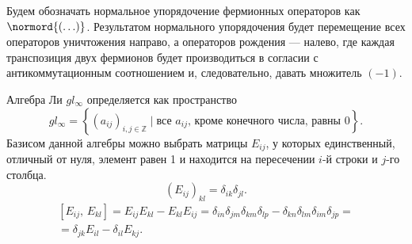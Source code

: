 \documentclass[a5paper,twoside]{extarticle}
\begin{document}
Будем обозначать нормальное упорядочение фермионных
операторов как $\normord{\left( \ldots \right) }$.
Результатом нормального упорядочения будет перемещение
всех операторов уничтожения направо, а операторов
рождения --- налево, где каждая транспозиция двух
фермионов будет производиться в согласии с антикоммутационным
соотношением и, следовательно, давать множитель $(-1)$. 

Алгебра Ли $gl_\infty$ определяется как пространство
\begin{equation}
	gl_\infty= \left\{ \left( a_{ij} \right) _{i,j \in \mathbb{Z}}\mid\text{все }a_{ij}\text{, кроме конечного
	числа, равны 0} \right\} 
.\end{equation} 
Базисом данной алгебры можно выбрать матрицы  $E_{ij}$,
у которых единственный, отличный от нуля, элемент равен 1 и находится
на пересечении $i$-й строки и $j$-го столбца.
 \begin{equation}
	(E_{ij})_{kl}=\delta_{ik}\delta_{jl}
.\end{equation} 
\begin{multline}
\left[ E_{ij},\,E_{kl} \right] =
E_{ij}E_{kl}-E_{kl}E_{ij}=
\delta_{in}\delta_{jm}\delta_{km}\delta_{lp}-
\delta_{kn}\delta_{lm}\delta_{im}\delta_{jp}=\\=
\delta_{jk}E_{il}-\delta_{il}E_{kj}
.\end{multline} 
\end{document}
